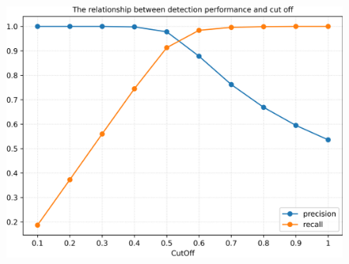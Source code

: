 \documentclass[fontset=macnew,UTF8]{article} %
\begin{document}
\begin{figure}[t]
{\begin{minipage}[b]{.3\linewidth}
			\includegraphics[scale=0.28]{./Backdoor_detect_result/detect/IAD.png}
		\end{minipage}
	}
	

\end{figure}
\end{document}
